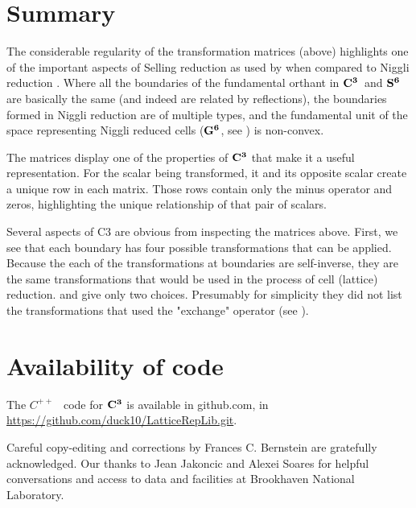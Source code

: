 \documentclass[preprint]{iucr}              %
\numberwithin{equation}{section}
\newcommand{\SVI}[0]{$\bf{S^{6}}$}
\newcommand{\GVI}[0]{$\bf{G^{6}}$}
\newcommand{\CIII}[0]{$\bf{C^{3}}$}
\begin{document}
\section{Summary}

The considerable regularity of the transformation matrices (above) highlights one
of the important aspects of Selling reduction as used by 
when compared to Niggli reduction \cite{Niggli1928}. Where all the 
boundaries of the fundamental orthant in \CIII ~and \SVI{} are basically the same (and indeed are 
related by reflections), the boundaries formed in Niggli reduction
are of multiple types, and the fundamental unit of the space
representing Niggli reduced cells (\GVI{}, see ) is non-convex.

The matrices display one of the properties of \CIII{} that make it a
useful representation. For the scalar being transformed, it and its 
opposite scalar create a unique row in each matrix. Those rows contain
only the minus operator and zeros, highlighting the unique relationship
of that pair of scalars.

Several aspects of C3 are obvious from inspecting the matrices above. 
First, we see that each boundary has four possible 
transformations that
can be applied. Because the each of the transformations at boundaries are 
self-inverse, they are the same transformations that would 
be used in the process of cell (lattice) reduction. 
 and   give 
only two choices. Presumably for simplicity they did not list
the transformations that used the "exchange" operator 
(see \cite{andrews2019b}).





\section{Availability of code}

The $C^{++}$ ~code for \CIII{} is available in github.com, in
\url{https://github.com/duck10/LatticeRepLib.git}.




Careful copy-editing and corrections by Frances C. Bernstein are 
gratefully acknowledged.	Our thanks to Jean Jakoncic and Alexei Soares for 
helpful conversations and access to data and facilities at 
Brookhaven National Laboratory.
\end{document}
